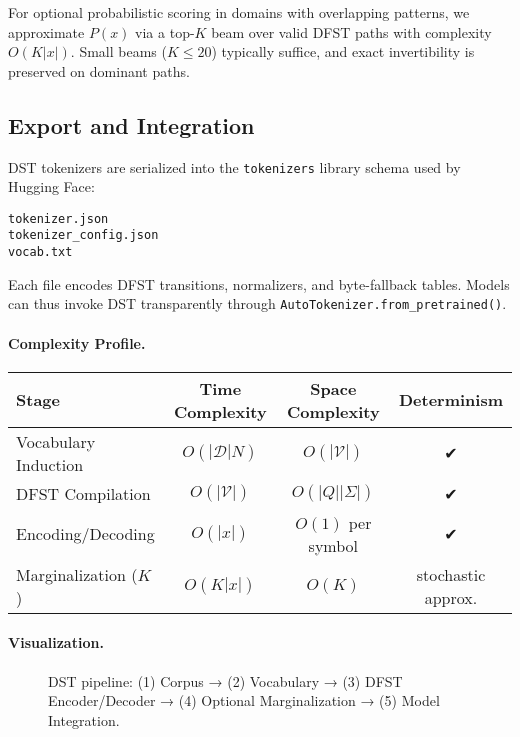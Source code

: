 For optional probabilistic scoring in domains with overlapping patterns, we approximate $P(x)$ via a top-$K$ beam over valid DFST paths with complexity $O(K|x|)$. Small beams ($K\!\le\!20$) typically suffice, and exact invertibility is preserved on dominant paths.

\subsection{Export and Integration}
\label{sec:method-export}

DST tokenizers are serialized into the
\texttt{tokenizers} library schema used by Hugging Face:

\begin{verbatim}
tokenizer.json
tokenizer_config.json
vocab.txt
\end{verbatim}

Each file encodes DFST transitions, normalizers,
and byte-fallback tables.
Models can thus invoke DST transparently through
\texttt{AutoTokenizer.from_pretrained()}.

\paragraph{Complexity Profile.}
\begin{center}
\begin{tabular}{lccc}
\toprule
Stage & Time Complexity & Space Complexity & Determinism \\
\midrule
Vocabulary Induction & $O(|\mathcal{D}|N)$ & $O(|\mathcal{V}|)$ & ✔ \\
DFST Compilation & $O(|\mathcal{V}|)$ & $O(|Q||\Sigma|)$ & ✔ \\
Encoding/Decoding & $O(|x|)$ & $O(1)$ per symbol & ✔ \\
Marginalization ($K$) & $O(K|x|)$ & $O(K)$ & stochastic approx. \\
\bottomrule
\end{tabular}
\end{center}

\paragraph{Visualization.}
\begin{figure}[h]
\centering
\caption{DST pipeline: (1) Corpus → (2) Vocabulary → (3) DFST Encoder/Decoder → (4) Optional Marginalization → (5) Model Integration.}
\label{fig:dst_pipeline}
\end{figure}

